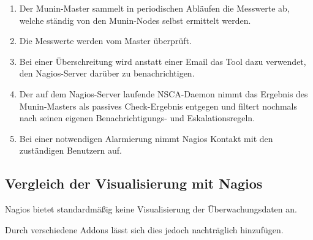 \begin{enumerate}
\item Der Munin-Master sammelt in periodischen Abläufen die Messwerte ab, welche ständig von den Munin-Nodes selbst ermittelt werden.
\item Die Messwerte werden vom Master überprüft.
\item Bei einer Überschreitung wird anstatt einer Email das Tool  dazu verwendet, den Nagios-Server darüber zu benachrichtigen.
\item Der auf dem Nagios-Server laufende NSCA-Daemon nimmt das Ergebnis des Munin-Masters als passives Check-Ergebnis entgegen und filtert nochmals nach seinen eigenen Benachrichtigungs- und Eskalationsregeln.
\item Bei einer notwendigen Alarmierung nimmt Nagios Kontakt mit den zuständigen Benutzern auf.
\end{enumerate}

\subsection{Vergleich der Visualisierung mit Nagios}

Nagios bietet standardmäßig keine Visualisierung der Überwachungsdaten an.

Durch verschiedene Addons lässt sich dies jedoch nachträglich hinzufügen.

